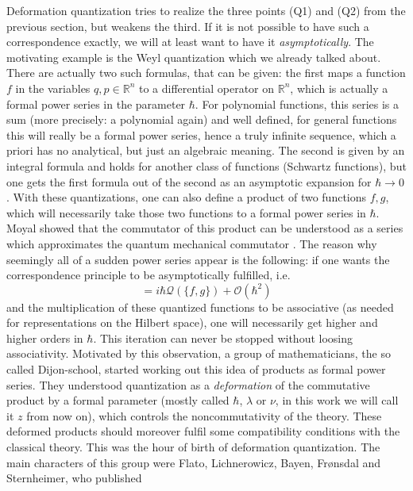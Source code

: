 Deformation quantization tries to realize the three points (Q1) and (Q2) from the 
previous section, but weakens the third. If it is not possible to have such a 
correspondence exactly, we will at least want to have it 
\emph{asymptotically}. The motivating example is the Weyl quantization which we 
already talked about. There are actually two such formulas, that can be given: the 
first maps a function $f$ in the variables $q, p \in \mathbb{R}^n$ to a 
differential operator on $\mathbb{R}^n$, which is actually a formal power series 
in the parameter $\hbar$. For polynomial functions, this series is a sum (more 
precisely: a polynomial again) and well defined, for general functions this will 
really be a formal power series, hence a truly infinite sequence, which a priori 
has no analytical, but just an algebraic meaning. 
The second is given by an integral formula and holds for another class of 
functions (Schwartz functions), but one gets the first formula out of the second 
as an asymptotic expansion for $\hbar \longrightarrow 0$. With these 
quantizations, one can also define a product of two functions $f, g$, which will 
necessarily take those two functions to a formal power series in $\hbar$. Moyal 
showed that the commutator of this product can be understood as a series which 
approximates the quantum mechanical commutator \cite{moyal:1949a}. The reason why 
seemingly all of a sudden power series appear is the following: if one wants the 
correspondence principle to be asymptotically fulfilled, i.e.
\begin{equation*}
	[\mathcal{Q}(f), \mathcal{g}]
	=
	i \hbar \mathcal{Q}(\{ f, g \})
	+ \mathcal{O}(\hbar^2)
\end{equation*}
and the multiplication of these quantized functions to be associative 
(as needed for representations on the Hilbert space), one will necessarily get 
higher and higher orders in $\hbar$. This iteration can never be stopped without 
loosing associativity. Motivated by this observation, a group of mathematicians, 
the so called Dijon-school, started working out this idea of products as formal 
power series. They understood quantization as a \emph{deformation} of the 
commutative product by a formal parameter (mostly called $\hbar$, $\lambda$ or 
$\nu$, in this work we will call it $z$ from now on), which controls the 
noncommutativity of the theory. These deformed products should moreover fulfil 
some compatibility conditions with the classical theory. This was the 
hour of birth of deformation quantization. The main characters of this group 
were Flato, Lichnerowicz, Bayen, Fr{\o}nsdal and Sternheimer, who published 
